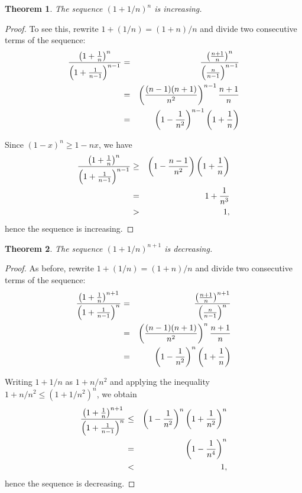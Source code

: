 \documentclass[12pt]{article}
\newtheorem{thm}{Theorem}
\begin{document}
\begin{thm}
The sequence $(1 + 1/n)^n$ is increasing.
\end{thm}

\begin{proof}
To see this, rewrite $1 + (1/n) = (1 + n)/n$ and divide two
consecutive terms of the sequence:
\begin{eqnarray*}
{ \left( 1 + {1 \over n} \right)^n \over  \left( 1 + {1
\over n-1} \right)^{n-1} } &=&
{ \left( {n+1 \over n} \right)^n \over \left( {n \over n-1}
\right)^{n-1} } \\
&=& \left( {(n-1)(n+1) \over n^2} \right)^{n-1} {n+1 \over n} \\
&=& \left( 1 - {1 \over n^2} \right)^{n-1} \left( 1 + {1 \over n}
\right) \\ 
\end{eqnarray*}

Since $(1 - x)^n \ge 1 - nx$, we have 
\begin{eqnarray*}
{ \left( 1 + {1 \over n} \right)^n \over  \left( 1 + {1
\over n-1} \right)^{n-1} } &\ge&
\left( 1 - {n-1 \over n^2} \right) \left( 1 + {1 \over n}
\right) \\
&=& 1 + {1 \over n^3}\\
&>& 1,
\end{eqnarray*}
hence the sequence is increasing.
\end{proof}

\begin{thm}
The sequence $(1 + 1/n)^{n+1}$ is decreasing.
\end{thm}

\begin{proof}

As before, rewrite $1 + (1/n) = (1 + n)/n$ and divide two
consecutive terms of the sequence:
\begin{eqnarray*}
{ \left( 1 + {1 \over n} \right)^{n+1} \over  \left( 1 + {1
\over n-1} \right)^{n} } &=&
{ \left( {n+1 \over n} \right)^{n+1} \over \left( {n \over n-1}
\right)^{n} } \\
&=& \left( {(n-1)(n+1) \over n^2} \right)^{n} {n+1 \over n} \\
&=& \left( 1 - {1 \over n^2} \right)^{n} \left( 1 + {1 \over n}
\right) \\ 
\end{eqnarray*}

Writing $1 + 1/n$ as $1 + n/n^2$ and applying the inequality
$1 + n/n^2 \le (1 + 1/n^2)^n$, we obtain
\begin{eqnarray*}
{ \left( 1 + {1 \over n} \right)^{n+1} \over  \left( 1 + {1
\over n-1} \right)^{n} } &\le&
\left( 1 - {1 \over n^2} \right)^{n} \left( 1 + {1 \over n^2}
\right)^n \\ 
&=& \left( 1 - {1 \over n^4} \right)^{n} \\
&<& 1, \\
\end{eqnarray*}
hence the sequence is decreasing.

\end{proof}
\end{document}
